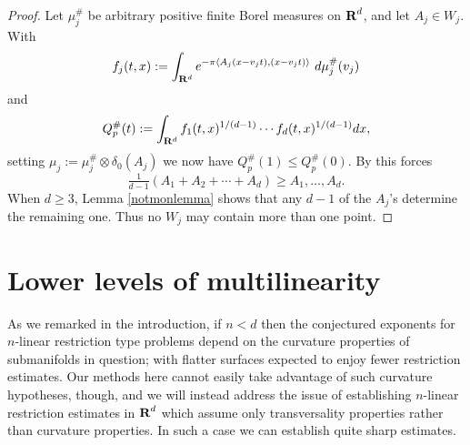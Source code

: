 \begin{proof}
Let $\mu_j^{\#}$ be arbitrary positive finite Borel measures on ${\hbox{\bf R}}^d$, and
let $A_j \in W_j$. With
$$f_{j}(t,x):=\int_{{\bf R}^d}
e^{-\pi \langle A_{j}(x-v_jt), (x-v_jt) \rangle}\ d\mu_{j}^{\#}(v_j)$$
and
$$Q^{\#}_p(t):=\int_{{\bf R}^d}f_{1}(t,x)^{1/(d-1)} \cdots
f_{d}(t,x)^{1/(d-1)}dx, $$
setting $\mu_j:=\mu_j^{\#}\otimes\delta_{0}(A_j)$
we now have $Q^\# _p (1) \leq Q^\# _p (0)$. By \cite[Proposition 3.6]{BCCT}
this forces
$$\tfrac{1}{d-1}(A_1+A_2+ \cdots + A_d)\geq A_1, \dots, A_d.$$
When $d \geq 3$, Lemma \ref{notmonlemma} shows that any $d-1$ of the
$A_j$'s determine the remaining one. Thus no $W_j$ may contain more
than one point.
\end{proof}

\section{Lower levels of multilinearity}

As we remarked in the introduction, if $n<d$ then the
conjectured exponents for $n$-linear restriction type problems
depend on the curvature properties of submanifolds in question; with flatter
surfaces expected to enjoy fewer restriction estimates.  Our methods here cannot easily
take advantage of such curvature hypotheses, though, and we will instead address
the issue of establishing $n$-linear restriction estimates in ${\hbox{\bf R}}^d$ which assume only
transversality properties rather than curvature properties.  In such a case we can
establish quite sharp estimates.

